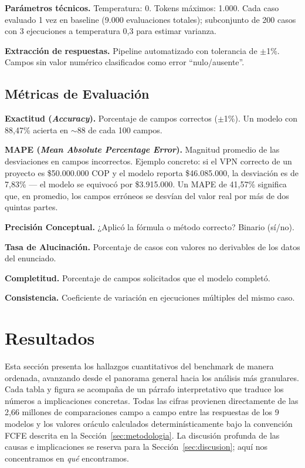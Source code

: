 \documentclass[12pt,a4paper]{article}
\begin{document}
\textbf{Parámetros técnicos.} Temperatura: 0. Tokens máximos: 1.000. Cada caso evaluado 1 vez en baseline (9.000 evaluaciones totales); subconjunto de 200 casos con 3 ejecuciones a temperatura 0,3 para estimar varianza.

\textbf{Extracción de respuestas.} Pipeline automatizado con tolerancia de $\pm$1\%. Campos sin valor numérico clasificados como error ``nulo/ausente''.

\subsection{Métricas de Evaluación}

\textbf{Exactitud (\textit{Accuracy}).} Porcentaje de campos correctos ($\pm$1\%). Un modelo con 88,47\% acierta en $\sim$88 de cada 100 campos.

\textbf{MAPE (\textit{Mean Absolute Percentage Error}).} Magnitud promedio de las desviaciones en campos incorrectos. Ejemplo concreto: si el VPN correcto de un proyecto es \$50.000.000 COP y el modelo reporta \$46.085.000, la desviación es de 7,83\% --- el modelo se equivocó por \$3.915.000. Un MAPE de 41,57\% significa que, en promedio, los campos erróneos se desvían del valor real por más de dos quintas partes.

\textbf{Precisión Conceptual.} ¿Aplicó la fórmula o método correcto? Binario (sí/no).

\textbf{Tasa de Alucinación.} Porcentaje de casos con valores no derivables de los datos del enunciado.

\textbf{Completitud.} Porcentaje de campos solicitados que el modelo completó.

\textbf{Consistencia.} Coeficiente de variación en ejecuciones múltiples del mismo caso.

\section{Resultados}\label{sec:resultados}

Esta sección presenta los hallazgos cuantitativos del benchmark de manera ordenada, avanzando desde el panorama general hacia los análisis más granulares. Cada tabla y figura se acompaña de un párrafo interpretativo que traduce los números a implicaciones concretas. Todas las cifras provienen directamente de las 2,66 millones de comparaciones campo a campo entre las respuestas de los 9 modelos y los valores oráculo calculados determinísticamente bajo la convención FCFE descrita en la Sección~\ref{sec:metodologia}. La discusión profunda de las causas e implicaciones se reserva para la Sección~\ref{sec:discusion}; aquí nos concentramos en \textit{qué} encontramos.
\end{document}
